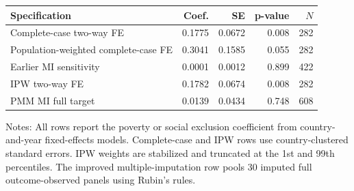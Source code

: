 \begin{tabular}{@{}lrrrr@{}}
\toprule
Specification & Coef. & SE & p-value & \(N\) \\
\midrule
Complete-case two-way FE & 0.1775 & 0.0672 & 0.008 & 282 \\
Population-weighted complete-case FE & 0.3041 & 0.1585 & 0.055 & 282 \\
Earlier MI sensitivity & 0.0001 & 0.0012 & 0.899 & 422 \\
IPW two-way FE & 0.1782 & 0.0674 & 0.008 & 282 \\
PMM MI full target & 0.0139 & 0.0434 & 0.748 & 608 \\
\bottomrule
\end{tabular}

\vspace{0.2em}
\begin{minipage}{0.92\textwidth}
\scriptsize Notes: All rows report the poverty or social exclusion coefficient from country-and-year fixed-effects models. Complete-case and IPW rows use country-clustered standard errors. IPW weights are stabilized and truncated at the 1st and 99th percentiles. The improved multiple-imputation row pools 30 imputed full outcome-observed panels using Rubin's rules.
\end{minipage}
